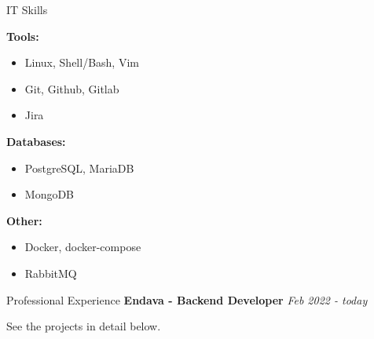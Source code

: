\documentclass{cv}
\begin{document}
\begin{rSection}{IT Skills}
\begin{minipage}[t]{\skillWidth\linewidth}
    \medskip

    \textbf{Tools:}
    \begin{itemize}
      \item Linux, Shell/Bash, Vim
      \item Git, Github, Gitlab
      \item Jira
    \end{itemize}

    \textbf{Databases:}
    \begin{itemize}
      \item PostgreSQL, MariaDB
      \item MongoDB
    \end{itemize}

    \textbf{Other:}
    \begin{itemize}
      \item Docker, docker-compose
      \item RabbitMQ
    \end{itemize}
  \end{minipage}
\end{rSection}

\begin{rSection}{Professional Experience}
  \textbf{Endava - Backend Developer}
  \hfill
  {\em Feb 2022 - today}

  See the projects in detail below.
\end{rSection}
\end{document}
